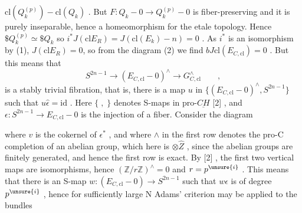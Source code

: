 
$\mathrm{cl}(Q_k^{(p)}) - \mathrm{cl}(Q_k)$ .  But  $F:Q_k - 0 \to Q_k^{(p)} - 0$  is fiber-preserving
and it is purely inseparable, hence a homeomorphism for the etale
topology.  Hence  $\$Q_k^{(p)} \simeq \$Q_k$  so  $i^*J(\mathrm{cl}E_R) = J(\mathrm{cl}(E_k) - n) = 0$ .
As  $i^*$ is an isomorphism by (1), $J(\mathrm{cl}E_R) = 0$, so from the diagram
(2) we find  $bJ\mathrm{cl}(E_{C,\mathrm{cl}}) = 0$ .  But this means that
\[ S^{2n-1} \to (E_{C,\mathrm{cl}} - 0)^{\wedge} \to G^{\wedge}_{C,\mathrm{cl}} \qquad , \]
is a stably trivial fibration, that is, there is a map  $u$  in
$\{(E_{C,\mathrm{cl}} - 0)^{\wedge} , S^{2n-1}\}$  such that  $u\hat{\epsilon} = \mathrm{id}$ .  Here  $\{ \; , \; \}$  denotes
S-maps in pro-$\underline{CH}$  [2] , and  $\epsilon:S^{2n-1} \to E_{C,\mathrm{cl}} - 0$  is the injection
of a fiber.  Consider the diagram


where  $v$  is the cokernel of  $\epsilon^*$ , and where  $\wedge$  in the first row
denotes the pro-C completion of an abelian group, which here is  $\otimes\hat{Z}$ ,
since the abelian groups are finitely generated, and hence the first
row is exact.  By [2] , the first two vertical maps are isomorphisms,
hence  $(\mathbb{Z}/r\mathbb{Z})^{\wedge} = 0$  and  $r = p^{\unsure{i}}$ .  This means that there is an S-map
$w:(E_{C,\mathrm{cl}} - 0) \to S^{2n-1}$  such that  $w\epsilon$  is of degree $p^{\unsure{i}}$ , hence for
sufficiently large  N  Adams' criterion may be applied to the bundles

